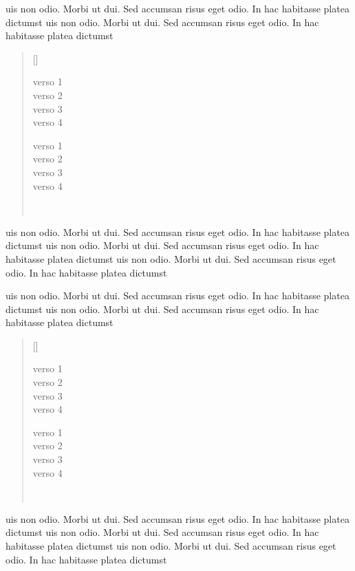 \documentclass[12pt,a4paper]{article}
\newcommand{\attrib}[1]{%
\nopagebreak{\raggedleft\footnotesize #1\par}}
\begin{document}

\begin{multicols}{2}

uis non odio. Morbi ut dui. Sed accumsan risus eget odio. In hac habitasse platea dictumst uis non odio. Morbi ut dui. Sed accumsan risus eget odio. In hac habitasse platea dictumst


\begin{verse}[\textwidth]

verso 1\\ 
verso 2\\ 
verso 3\\ 
verso 4

verso 1\\ 
verso 2\\ 
verso 3\\ 
verso 4

\hfill \\
\attrib{nome do autor}

\end{verse}

uis non odio. Morbi ut dui. Sed accumsan risus eget odio. In hac habitasse platea dictumst uis non odio. Morbi ut dui. Sed accumsan risus eget odio. In hac habitasse platea dictumst uis non odio. Morbi ut dui. Sed accumsan risus eget odio. In hac habitasse platea dictumst

\end{multicols}



uis non odio. Morbi ut dui. Sed accumsan risus eget odio. In hac habitasse platea dictumst uis non odio. Morbi ut dui. Sed accumsan risus eget odio. In hac habitasse platea dictumst


\begin{verse}[\textwidth]

verso 1\\ 
verso 2\\ 
verso 3\\ 
verso 4

verso 1\\ 
verso 2\\ 
verso 3\\ 
verso 4

\hfill \\
\attrib{nome do autor}

\end{verse}

uis non odio. Morbi ut dui. Sed accumsan risus eget odio. In hac habitasse platea dictumst uis non odio. Morbi ut dui. Sed accumsan risus eget odio. In hac habitasse platea dictumst uis non odio. Morbi ut dui. Sed accumsan risus eget odio. In hac habitasse platea dictumst
\end{document}
